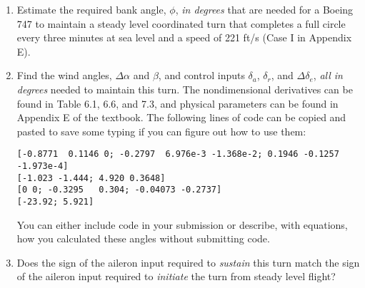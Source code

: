 \begin{question}
\begin{enumerate} \-\
    \item Estimate the required bank angle, $\phi$, \emph{in degrees} that are needed for a Boeing 747 to maintain a steady level coordinated turn that completes a full circle every three minutes at sea level and a speed of 221 ft/s (Case I in Appendix E).

    \item Find the wind angles, $\Delta \alpha$ and $\beta$, and control inputs $\delta_a$, $\delta_r$, and $\Delta \delta_e$, \emph{all in degrees} needed to maintain this turn. The nondimensional derivatives can be found in Table 6.1, 6.6, and 7.3, and physical parameters can be found in Appendix E of the textbook. The following lines of code can be copied and pasted to save some typing if you can figure out how to use them:

\begin{verbatim}
[-0.8771  0.1146 0; -0.2797  6.976e-3 -1.368e-2; 0.1946 -0.1257 -1.973e-4]
[-1.023 -1.444; 4.920 0.3648]
[0 0; -0.3295   0.304; -0.04073 -0.2737]
[-23.92; 5.921]
\end{verbatim}
    
    You can either include code in your submission or describe, with equations, how you calculated these angles without submitting code.

    \item Does the sign of the aileron input required to \emph{sustain} this turn match the sign of the aileron input required to \emph{initiate} the turn from steady level flight?
\end{enumerate}

\end{question}

